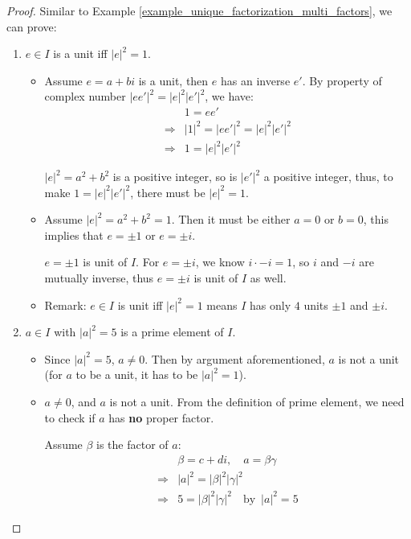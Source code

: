 \documentclass[utf8]{ctexbook}
\begin{document}
\begin{proof}
Similar to Example \ref{example_unique_factorization_multi_factors}, we can prove:
\begin{enumerate}
\item{$ e \in I$ is a unit iff $|e|^2 = 1$.}

\begin{itemize}
\item{Assume $e = a + b i$ is a unit, then $e$ has an inverse $e'$. By property of complex number $|e e'|^2 = |e|^2 |e'|^2$, we have:
\begin{align*}
& 1 = e e' \\
\Longrightarrow & |1 |^2 = |e e'|^2 =  |e|^2 |e'|^2 \\
\Longrightarrow & 1 = |e|^2 |e'|^2
\end{align*}

$|e|^2 = a^2 + b^2$ is a positive integer, so is $|e'|^2$ a positive integer, thus, to make $1 = |e|^2 |e'|^2$, there must be $|e|^2 =1 $.
}
\item{Assume $|e|^2 = a^2 + b^2 = 1$. Then it must be either $a=0$ or $b = 0$, this implies that $e = \pm 1$ or $e = \pm i$.

$e = \pm 1$ is unit of $I$. For $e = \pm i$, we know $i \cdot - i = 1$, so $i$ and $-i$ are mutually inverse, thus $e = \pm i$ is unit of $I$ as well.}
\item{Remark: $e \in I$ is unit iff $|e|^2 = 1$ means $I$ has only $4$ units $\pm 1$ and $\pm i$.}
\end{itemize}


\item{$a \in I$ with $|a|^2 = 5$ is a prime element of $I$.}

\begin{itemize}
\item{Since $|a|^2 = 5$, $a \neq 0$. Then by argument aforementioned, $a$ is not a unit (for $a$ to be a unit, it has to be $|a|^2 = 1$). }
\item{$a \neq 0$, and $a$ is not a unit. From the definition of prime element, we need to check if $a$ has \textbf{no} proper factor.

Assume $\beta$ is the factor of $a$:
\begin{align*}
& \beta = c + d i, \quad a = \beta \gamma \\
\Longrightarrow & |a|^2 = |\beta |^2 | \gamma |^2 \\
\Longrightarrow & 5 =  |\beta |^2 | \gamma |^2 \quad \mbox{by } \, |a|^2 = 5
\end{align*}

}
\end{itemize}
\end{enumerate}
\end{proof}
\end{document}
